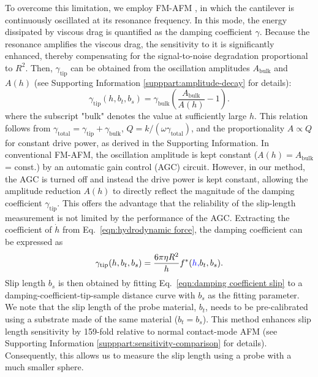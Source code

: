 \documentclass[journal=jacsat,manuscript=article]{achemso}
\providecommand{\DIFadd}[1]{{\protect\color{blue}#1}} %
\providecommand{\DIFaddbegin}{} %
\providecommand{\DIFaddend}{} %
\newcommand{\DIFaddincludegraphics}[2][]{{\color{blue}\DIFOincludegraphics[#1]{#2}}} %
\DeclareRobustCommand{\DIFaddbegin}{\DIFOaddbegin \let\includegraphics\DIFaddincludegraphics} %
\DeclareRobustCommand{\DIFaddend}{\DIFOaddend \let\includegraphics\DIFOincludegraphics} %
\begin{document}
To overcome this limitation, we employ FM-AFM \cite{Albrecht1991-wp}, in which the cantilever is continuously oscillated at its resonance frequency. In this mode, the energy dissipated by viscous drag is quantified as the damping coefficient \(\gamma\). Because the resonance amplifies the viscous drag, the sensitivity to it is significantly enhanced, thereby compensating for the signal-to-noise degradation proportional to \(R^2\). Then, \(\gamma_{\text{tip}}\) can be obtained from the oscillation amplitudes \(A_{\text{bulk}}\) and \(A(h)\) (see Supporting Information  \ref{supppart:amplitude-decay} for details):
\begin{equation}
\gamma_{\text{tip}} (h,b_t,b_s)=\gamma_{\text{bulk}} \left(\frac{A_{\text{bulk}}}{A(h)} -1\right). \label{eqn:damping coefficient amplitude}
\end{equation}
where the subscript "bulk" denotes the value at sufficiently large \(h\). \DIFaddbegin \DIFadd{This relation follows from \(\gamma_{\text{total}}=\gamma_{\text{tip}}+\gamma_{\text{bulk}}\), \(Q=k/(\omega\gamma_{\text{total}})\), and the proportionality \(A\propto Q\) for constant drive power, as derived in the Supporting Information. }\DIFaddend In conventional FM-AFM, the oscillation amplitude is kept constant (\(A(h) = A_{\text{bulk}}\) = const.) by an automatic gain control (AGC) circuit. However, in our method, the AGC is turned off and instead the drive power is kept constant, allowing the amplitude reduction \(A(h)\) to directly reflect the magnitude of the damping coefficient \(\gamma_{\text{tip}}\). This offers the advantage that the reliability of the slip-length measurement is not limited by the performance of the AGC. Extracting the coefficient of \(\dot{h}\) from Eq.~\ref{eqn:hydrodynamic force}, the damping coefficient can be expressed as
\begin{equation}
\gamma_{\text{tip}} (h,b_t,b_s)=\frac{6\pi\eta R^2}{h} f^* (\DIFaddbegin \DIFadd{h,}\DIFaddend b_t,b_s). \label{eqn:damping coefficient slip}
\end{equation}
Slip length \(b_s\) is then obtained by fitting Eq.~\ref{eqn:damping coefficient slip} to a damping-coefficient-tip-sample distance curve with \(b_s\) as the fitting parameter. We note that the slip length of the probe material, \(b_t\), needs to be pre-calibrated using a substrate made of the same material (\(b_t=b_s\)). This method enhances slip length sensitivity by 159-fold relative to normal contact-mode AFM (see Supporting Information \ref{supppart:sensitivity-comparison} for details). Consequently, this allows us to measure the slip length using a probe with a much smaller sphere. 
\end{document}
